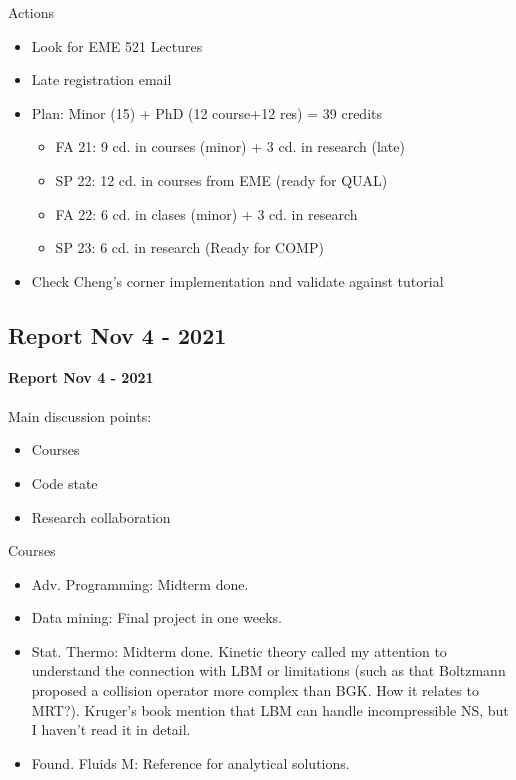 \documentclass{beamer}
\begin{document}
	\begin{frame}{Actions}
		\begin{itemize}
			\item Look for EME 521 Lectures
			\item Late registration email
			\item Plan: Minor (15) + PhD (12 course+12 res) = 39 credits
			\begin{itemize}
				\item FA 21: 9 cd. in courses (minor) + 3 cd. in research (late)
				\item SP 22: 12 cd. in courses from EME (ready for QUAL)
				\item FA 22: 6 cd. in clases (minor) + 3 cd. in research
				\item SP 23: 6 cd. in research (Ready for COMP)
			\end{itemize}
			\item Check Cheng's corner implementation and validate against tutorial
		\end{itemize}
	\end{frame}


	\subsection{Report Nov 4 - 2021}
	\justifying
	\begin{frame}
		\textbf{Report Nov 4 - 2021}\\~\\
		Main discussion points:
		\begin{itemize}
			\item Courses
			\item Code state
			\item Research collaboration 
		\end{itemize}
	\end{frame}
	
	\begin{frame}{Courses}
		\begin{itemize}
			\item Adv. Programming: Midterm done.
			\item Data mining: Final project in one weeks.
			\item Stat. Thermo: Midterm done. Kinetic theory called my attention to understand the connection with LBM or limitations (such as that Boltzmann proposed a collision operator more complex than BGK. How it relates to MRT?). Kruger's book mention that LBM can handle incompressible NS, but I haven't read it in detail.
			\item Found. Fluids M: Reference for analytical solutions.
		\end{itemize}
	\end{frame}
	
\end{document}
